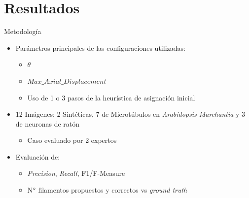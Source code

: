 \section{Resultados}



\begin{frame}{Metodolog\'ia}
\begin{itemize}
    \item Par\'ametros principales de las configuraciones utilizadas:
        \begin{itemize}
            \item $\theta$
            \item $Max\_Axial\_Displacement$
            \item Uso de 1 o 3 pasos de la heur\'istica de asignaci\'on inicial
        \end{itemize}
    
    \item 12 Im\'agenes: 2 Sint\'eticas, 7 de Microt\'ubulos en {\it Arabidopsis Marchantia} y 3 de neuronas de rat\'on
    \begin{itemize}
        \item Caso evaluado por 2 expertos
    \end{itemize}
    
    \item Evaluaci\'on de:
        \begin{itemize}
            \item {\it Precision}, {\it Recall}, F1/F-Measure
            \item N$\degree$ filamentos propuestos y correctos vs {\it ground truth}
        \end{itemize}
\end{itemize}
\end{frame}


